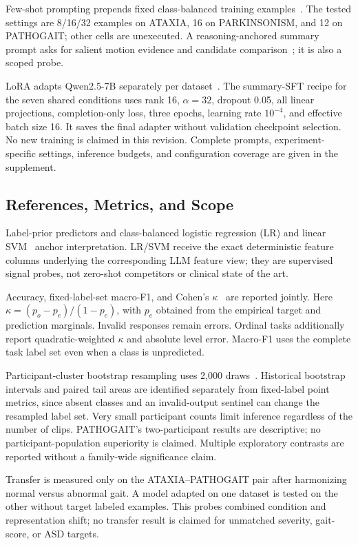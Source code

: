 Few-shot prompting prepends fixed class-balanced training examples~\cite{brown2020fewshot}. The tested settings are 8/16/32 examples on ATAXIA, 16 on PARKINSONISM, and 12 on PATHOGAIT; other cells are unexecuted. A reasoning-anchored summary prompt asks for salient motion evidence and candidate comparison~\cite{wei2022cot}; it is also a scoped probe.

LoRA adapts Qwen2.5-7B separately per dataset~\cite{hu2022lora}. The summary-SFT recipe for the seven shared conditions uses rank 16, $\alpha=32$, dropout 0.05, all linear projections, completion-only loss, three epochs, learning rate $10^{-4}$, and effective batch size 16. It saves the final adapter without validation checkpoint selection. No new training is claimed in this revision. Complete prompts, experiment-specific settings, inference budgets, and configuration coverage are given in the supplement.

\subsection{References, Metrics, and Scope}
\label{sec:metrics}
Label-prior predictors and class-balanced logistic regression (LR) and linear SVM~\cite{cortes1995svm,pedregosa2011scikit} anchor interpretation. LR/SVM receive the exact deterministic feature columns underlying the corresponding LLM feature view; they are supervised signal probes, not zero-shot competitors or clinical state of the art.

Accuracy, fixed-label-set macro-F1, and Cohen's $\kappa$~\cite{cohen1968weighted,opitz2019macro,sokolova2009performance} are reported jointly. Here $\kappa=(p_o-p_e)/(1-p_e)$, with $p_e$ obtained from the empirical target and prediction marginals. Invalid responses remain errors. Ordinal tasks additionally report quadratic-weighted $\kappa$ and absolute level error. Macro-F1 uses the complete task label set even when a class is unpredicted.

Participant-cluster bootstrap resampling uses 2,000 draws~\cite{efron1993bootstrap}. Historical bootstrap intervals and paired tail areas are identified separately from fixed-label point metrics, since absent classes and an invalid-output sentinel can change the resampled label set. Very small participant counts limit inference regardless of the number of clips. PATHOGAIT's two-participant results are descriptive; no participant-population superiority is claimed. Multiple exploratory contrasts are reported without a family-wide significance claim.

Transfer is measured only on the ATAXIA--PATHOGAIT pair after harmonizing normal versus abnormal gait. A model adapted on one dataset is tested on the other without target labeled examples. This probes combined condition and representation shift; no transfer result is claimed for unmatched severity, gait-score, or ASD targets.
